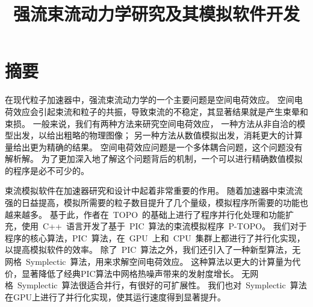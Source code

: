   \confidential{}%
  \title[强流束流动力学研究及其模拟软件开发]{强流束流动力学研究及其模拟软件开发}%
  \author{ }%
  \advisor{ }%

  \englishauthor{ }
  \englishadvisor{ }
\maketitle
\makeenglishtitle
\makedeclaration
\chapter{摘\quad 要}%

在现代粒子加速器中，强流束流动力学的一个主要问题是空间电荷效应。
空间电荷效应会引起束流和粒子的共振，导致束流的不稳定，其显著结果就是产生束晕和束损。
一般来说，我们有两种方法来研究空间电荷效应，
一种方法从非自洽的模型出发，以给出粗略的物理图像；
另一种方法从数值模拟出发，消耗更大的计算量给出更为精确的结果。
空间电荷效应问题是一个多体耦合问题，这个问题没有解析解。
为了更加深入地了解这个问题背后的机制，一个可以进行精确数值模拟的程序是必不可少的。

束流模拟软件在加速器研究和设计中起着非常重要的作用。
随着加速器中束流流强的日益提高，模拟所需要的粒子数目提升了几个量级，模拟程序所需要的功能也越来越多。
基于此，作者在~TOPO~的基础上进行了程序并行化处理和功能扩充，使用~C++~语言开发了基于~PIC~算法的束流模拟程序~P-TOPO。
我们对于程序的核心算法，PIC~算法，在~GPU~上和~CPU~集群上都进行了并行化实现，以提高模拟软件的效率。
除了~PIC~算法之外，我们还引入了一种新型算法，无网格~Symplectic~算法，用来求解空间电荷效应。
这种算法以更大的计算量为代价，显著降低了经典PIC算法中网格热噪声带来的发射度增长。
无网格~Symplectic~算法很适合并行，有很好的可扩展性。
我们也对~Symplectic~算法在GPU上进行了并行化实现，使其运行速度得到显著提升。

